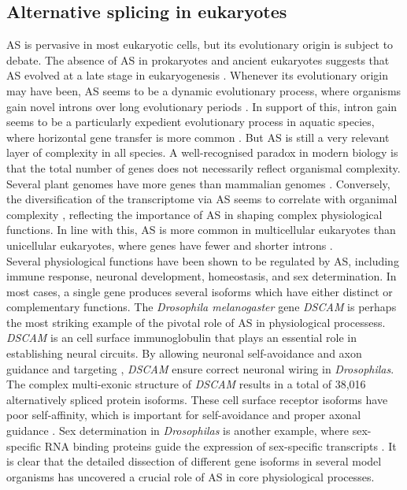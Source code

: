 \subsection{Alternative splicing in eukaryotes}
AS is pervasive in most eukaryotic cells, but its evolutionary origin is subject to debate. The absence of AS in prokaryotes and ancient eukaryotes suggests that AS evolved at a late stage in eukaryogenesis \cite{Koonin2006-eh}. Whenever its evolutionary origin may have been, AS seems to be a dynamic evolutionary process, where organisms gain novel introns over long evolutionary periods \cite{Knowles2006-zy}. In support of this, intron gain seems to be a particularly expedient evolutionary process in aquatic species, where horizontal gene transfer is more common \cite{Gozashti2022-bz}. But AS is still a very relevant layer of complexity in all species. A well-recognised paradox in modern biology is that the total number of genes does not necessarily reflect organismal complexity. Several plant genomes have more genes than mammalian genomes \cite{Messing2001-wb}. Conversely, the diversification of the transcriptome via AS seems to correlate with organimal complexity \cite{Bush2017-nz}, reflecting the importance of AS in shaping complex physiological functions. In line with this, AS is more common in multicellular eukaryotes than unicellular eukaryotes, where genes have fewer and shorter introns \cite{Marasco2023-kt}. \\

Several physiological functions have been shown to be regulated by AS, including immune response, neuronal development, homeostasis, and sex determination. In most cases, a single gene produces several isoforms which have either distinct or complementary functions. The \textit{Drosophila melanogaster} gene \textit{DSCAM} is perhaps the most striking example of the pivotal role of AS in physiological processess. \textit{DSCAM} is an cell surface immunoglobulin that plays an essential role in establishing neural circuits. By allowing neuronal self-avoidance and axon guidance and targeting \cite{Hattori2008-jd}, \textit{DSCAM} ensure correct neuronal wiring in \textit{Drosophilas}. The complex multi-exonic structure of \textit{DSCAM} results in a total of 38,016 alternatively spliced protein isoforms. These cell surface receptor isoforms have poor self-affinity, which is important for self-avoidance and proper axonal guidance \cite{Wojtowicz2004-df}. Sex determination in \textit{Drosophilas} is another example, where sex-specific RNA binding proteins guide the expression of sex-specific transcripts \cite{Penalva2003-bu}. It is clear that the detailed dissection of different gene isoforms in several model organisms has uncovered a crucial role of AS in core physiological processes. 

